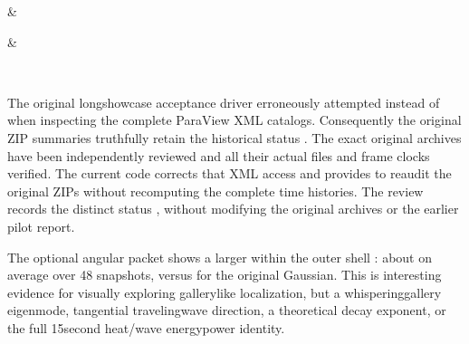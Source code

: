 \documentclass[letterpaper,10pt,english]{sphinxmanual}
\begin{document}
\begin{savenotes}
\begin{tabular}[t]{}
\begin{varwidth}[t]{}
\sphinxAtStartPar
{}
\sphinxbeforeendvarwidth
\end{varwidth}%
&\begin{varwidth}[t]{}
\sphinxAtStartPar
{}
\sphinxbeforeendvarwidth
\end{varwidth}%
&\begin{varwidth}[t]{}
\sphinxAtStartPar
{}
\sphinxbeforeendvarwidth
\end{varwidth}%
\\
\sphinxbottomrule
\end{tabular}
\sphinxtableafterendhook\par
\sphinxattableend\end{savenotes}

\sphinxAtStartPar
The original long\sphinxhyphen{}showcase acceptance driver
erroneously attempted 
instead of 
when inspecting the complete
ParaView XML catalogs. Consequently
the original ZIP summaries truthfully
retain the historical
status .
The exact original archives have
been independently reviewed and all
their actual files and frame clocks
verified. The current code corrects
that XML access and provides
to re\sphinxhyphen{}audit the original ZIPs
without recomputing the complete
time histories. The review records
the distinct status
,
without modifying the original
archives or the earlier pilot report.

\sphinxAtStartPar
The optional angular packet shows
a larger 
within the outer shell :
about  on average over
48 snapshots, versus 
for the original Gaussian. This is
interesting evidence for visually
exploring gallery\sphinxhyphen{}like localization,
but  a
whispering\sphinxhyphen{}gallery eigenmode,
tangential traveling\sphinxhyphen{}wave direction,
a theoretical decay exponent, or
the full 15\sphinxhyphen{}second heat/wave
energy\sphinxhyphen{}power identity.
\end{document}
